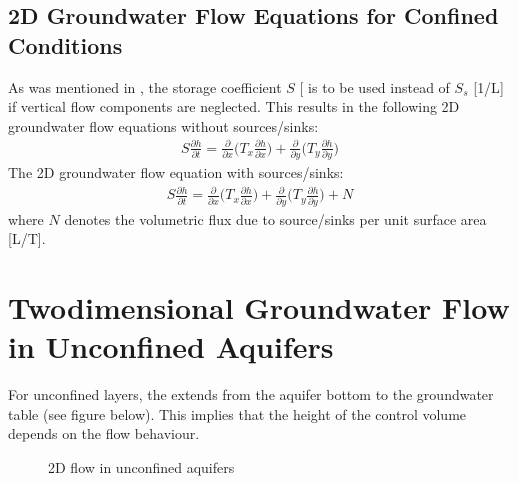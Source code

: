 \documentclass[letterpaper,10pt,english]{jupyterBook}
\begin{document}
\subsection{2D Groundwater Flow Equations for Confined Conditions}
\label{\detokenize{content/flow/L7/17_quantify_flow:d-groundwater-flow-equations-for-confined-conditions}}
\sphinxAtStartPar
As was mentioned in {\hyperref[\detokenize{content/flow/L3/13_gw_storage::doc}]{}}, the storage coefficient \(S\) {[}\sphinxhyphen{}{]} is to be used instead of \(S_s\) {[}1/L{]} if vertical flow components are neglected. This results in the following 2D groundwater flow equations without sources/sinks:
\begin{equation*}
\begin{split}
S\frac{\partial h}{\partial t} = \frac{\partial }{\partial x}\bigg(T_x\frac{\partial h}{\partial x}\bigg) + \frac{\partial }{\partial y}\bigg(T_y\frac{\partial h}{\partial y}\bigg)
\end{split}
\end{equation*}
\sphinxAtStartPar
The 2D groundwater flow equation with sources/sinks:
\begin{equation*}
\begin{split}
S\frac{\partial h}{\partial t} = \frac{\partial }{\partial x}\bigg(T_x\frac{\partial h}{\partial x}\bigg) + \frac{\partial }{\partial y}\bigg(T_y\frac{\partial h}{\partial y}\bigg) + N
\end{split}
\end{equation*}
\sphinxAtStartPar
where \(N\) denotes the volumetric flux due to source/sinks per unit surface area {[}L/T{]}.


\section{Two\sphinxhyphen{}dimensional Groundwater Flow in Unconfined Aquifers}
\label{\detokenize{content/flow/L7/17_quantify_flow:two-dimensional-groundwater-flow-in-unconfined-aquifers}}
\sphinxAtStartPar
For unconfined layers, the  extends from the aquifer bottom to the groundwater table (see figure below). This implies that the height of the control volume depends on the flow behaviour.

\begin{figure}[htbp]
\centering
\capstart

\noindent{}
\caption{2D\sphinxhyphen{} flow in unconfined aquifers}\label{\detokenize{content/flow/L7/17_quantify_flow:d-unconfined}}\end{figure}
\end{document}
